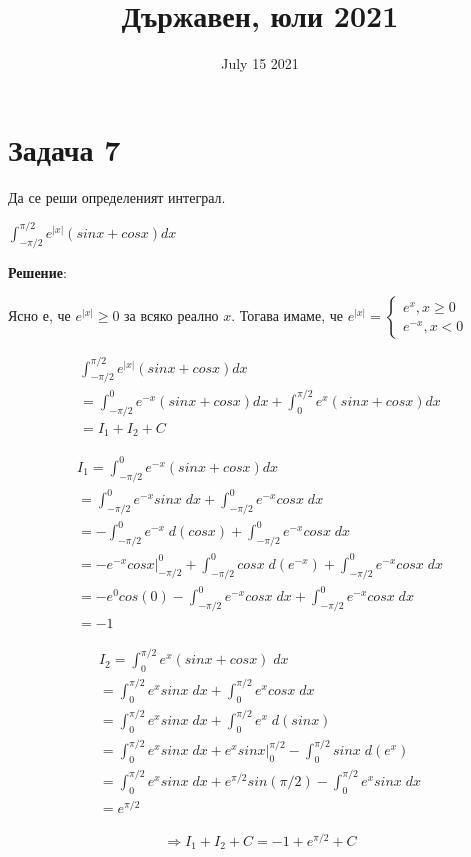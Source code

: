 \documentclass[fleqn,12pt]{article}
\title{Държавен, юли 2021}
\date{July 15 2021}
\begin{document}
\maketitle

\section{Задача 7}
Да се реши определеният интеграл.

$\int_{-\pi/2}^{\pi/2} e^{|x|}(sinx + cosx) dx$

\vspace{10pt}

\textbf{Решение}: 

Ясно е, че $e^{|x|} \geq 0$ за всяко реално $x$. Тогава имаме, че
\begin{math}
    e^{|x|} = 
    \begin{cases}
        e^x, x \geq 0 \\
        e^{-x}, x < 0
    \end{cases}
\end{math}

\begin{gather*} 
    \int_{-\pi/2}^{\pi/2} e^{|x|}(sinx + cosx) dx \\
    = \int_{-\pi/2}^{0} e^{-x}(sinx + cosx) dx + \int_{0}^{\pi/2} e^{x}(sinx + cosx) dx \\
    = I_1 + I_2 + C
\end{gather*}

\begin{gather*}
    I_1 = \int_{-\pi/2}^{0} e^{-x}(sinx + cosx) dx \\
    = \int_{-\pi/2}^{0} e^{-x}sinx \; dx + \int_{-\pi/2}^{0} e^{-x}cosx \; dx \\
    = -\int_{-\pi/2}^{0} e^{-x} \; d(cosx) + \int_{-\pi/2}^{0} e^{-x}cosx \; dx \\
    = -e^{-x}cosx | ^{0}_{-\pi/2} + \int_{-\pi/2}^{0} cosx \; d(e^{-x}) + \int_{-\pi/2}^{0} e^{-x}cosx \; dx \\
    = -e^{0}cos(0) - \int_{-\pi/2}^{0} e^{-x}cosx \; dx + \int_{-\pi/2}^{0} e^{-x}cosx \; dx \\
    = - 1
\end{gather*}


\begin{gather*}
    I_2 = \int_{0}^{\pi/2} e^{x}(sinx + cosx) \; dx \\
    = \int_{0}^{\pi/2} e^{x}sinx \; dx + \int_{0}^{\pi/2} e^{x}cosx \; dx \\
    = \int_{0}^{\pi/2} e^{x}sinx \; dx + \int_{0}^{\pi/2} e^{x} \; d(sinx) \\
    = \int_{0}^{\pi/2} e^{x}sinx \; dx + e^{x}sinx | ^{\pi/2}_{0} - \int_{0}^{\pi/2} sinx \; d(e^{x}) \\
    = \int_{0}^{\pi/2} e^{x}sinx \; dx + e^{\pi/2}sin(\pi/2) - \int_{0}^{\pi/2} e^{x}sinx \; dx \\
    = e^{\pi/2}
\end{gather*}

\begin{gather*}
    \Longrightarrow  I_1 + I_2 + C = -1 + e^{\pi/2} + C
\end{gather*}
\end{document}
